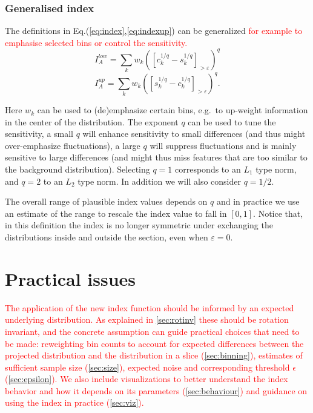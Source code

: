 \documentclass[]{interact}
\theoremstyle{plain}%
\theoremstyle{definition}
\theoremstyle{remark}
\begin{document}
\hypertarget{sec:generalise}{%
\subsubsection*{Generalised index}\label{sec:generalise}}

The definitions in Eq.(\ref{eq:index},\ref{eq:indexup}) can be
generalized
\textcolor{red}{for example to emphasise selected bins or control the sensitivity.}
\begin{equation}
I_A^{low} = \sum_{k}w_{k}\left(\left[c_{k}^{1/q}-s_{k}^{1/q}\right]_{>\varepsilon}\right)^{q}
\label{eq:index2}
\end{equation} \begin{equation}
I_A^{up} = \sum_{k}w_{k}\left(\left[s_{k}^{1/q}-c_{k}^{1/q}\right]_{>\varepsilon}\right)^{q}.
\label{eq:index2up}
\end{equation}

Here \(w_k\) can be used to (de)emphasize certain bins, e.g.~to
up-weight information in the center of the distribution. The exponent
\(q\) can be used to tune the sensitivity, a small \(q\) will enhance
sensitivity to small differences (and thus might over-emphasize
fluctuations), a large \(q\) will suppress fluctuations and is mainly
sensitive to large differences (and might thus miss features that are
too similar to the background distribution). Selecting \(q=1\)
corresponds to an \(L_1\) type norm, and \(q=2\) to an \(L_2\) type
norm. In addition we will also consider \(q=1/2\).

The overall range of plausible index values depends on \(q\) and in
practice we use an estimate of the range to rescale the index value to
fall in \([0,1]\). Notice that, in this definition the index is no
longer symmetric under exchanging the distributions inside and outside
the section, even when \(\varepsilon=0\).

\hypertarget{practical-issues}{%
\section{\texorpdfstring{Practical issues
\label{sec:practical}}{Practical issues }}\label{practical-issues}}

\textcolor{red}{
The application of the new index function should be informed by an expected underlying distribution. As explained in \ref{sec:rotinv} these should be rotation invariant, and the concrete assumption can guide practical choices that need to be made: reweighting bin counts to account for expected differences between the projected distribution and the distribution in a slice (\ref{sec:binning}), estimates of sufficient sample size (\ref{sec:size}), expected noise and corresponding threshold $\epsilon$ (\ref{sec:epsilon}).
We also include visualizations to better understand the index behavior and how it depends on its parameters (\ref{sec:behaviour}) and guidance on using the index in practice (\ref{sec:viz}).
}
\end{document}
